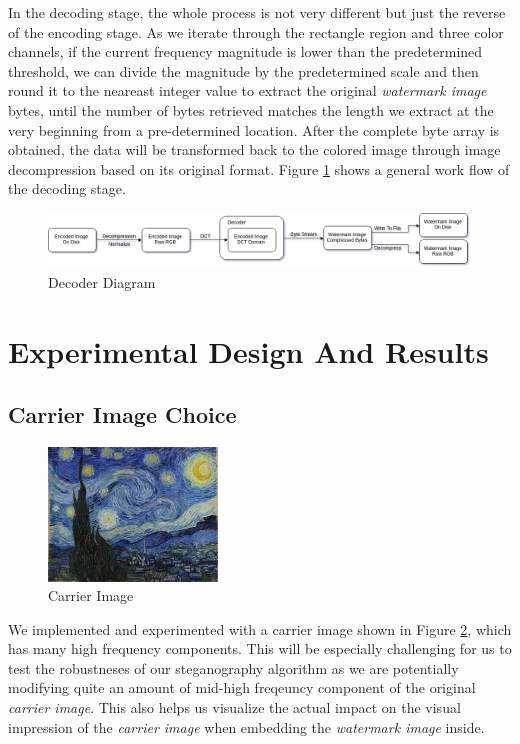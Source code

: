 \documentclass{article}
\begin{document}
In the decoding stage, the whole process is not very different but just the
reverse of the encoding stage. As we iterate through the rectangle region and
three color channels, if the current frequency magnitude is lower than the
predetermined threshold, we can divide the magnitude by the predetermined scale
and then round it to the neareast integer value to extract the original
\textit{watermark image} bytes, until the number of bytes retrieved matches the
length we extract at the very beginning from a pre-determined location. After
the complete byte array is obtained, the data will be transformed back to the
colored image through image decompression based on its original format. Figure
\ref{fig:decoder} shows a general work flow of the decoding stage.

\begin{figure}[h]
    \centering
    \includegraphics[width=\textwidth]{decoder}
    \caption{Decoder Diagram}
    \label{fig:decoder}
\end{figure}

\section{Experimental Design And Results}

\subsection{Carrier Image Choice}

\begin{figure}
    \centering
    \includegraphics[width=0.40\textwidth]{starry_night}
    \caption{Carrier Image}
    \label{fig:starry}
\end{figure}

We implemented and experimented with a carrier image shown in Figure
\ref{fig:starry}, which has many high frequency components. This will be
especially challenging for us to test the robustneses of our steganography
algorithm as we are potentially modifying quite an amount of mid-high freqeuncy
component of the original \textit{carrier image}. This also helps us visualize
the actual impact on the visual impression of the \textit{carrier image} when
embedding the \textit{watermark image} inside.
\end{document}
